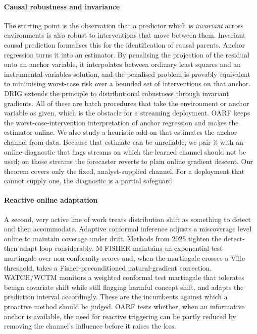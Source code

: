 \documentclass[authoryear,preprint,12pt]{elsarticle}
\theoremstyle{plain}
\theoremstyle{remark}
\newcommand{\OARF}{\textsc{OARF}}
\begin{document}
\paragraph{Causal robustness and invariance} The starting point is the observation
that a predictor which is \emph{invariant} across environments is also robust to
interventions that move between them. Invariant causal prediction
\citep{peters2016invariant} formalises this for the identification of causal
parents. Anchor regression \citep{rothenhausler2021anchor} turns it into an
estimator. By penalising the projection of the residual onto an anchor variable, it
interpolates between ordinary least squares and an instrumental-variables solution,
and the penalised problem is provably equivalent to minimising worst-case risk over
a bounded set of interventions on that anchor. DRIG \citep{shen2023drig} extends
the principle to distributional robustness through invariant gradients. All of
these are batch procedures that take the environment or anchor variable as given,
which is the obstacle for a streaming deployment. \OARF{} keeps the
worst-case-intervention interpretation of anchor regression and makes the estimator
online. We also study a heuristic add-on that estimates the anchor channel from
data. Because that estimate can be unreliable, we pair it with an online diagnostic
that flags streams on which the learned channel should not be used; on those streams
the forecaster reverts to plain online gradient descent. Our theorem covers only the
fixed, analyst-supplied channel. For a deployment that cannot supply one, the
diagnostic is a partial safeguard.

\paragraph{Reactive online adaptation} A second, very active line of work treats
distribution shift as something to detect and then accommodate. Adaptive conformal
inference \citep{gibbs2021aci} adjusts a miscoverage level online to maintain
coverage under drift. Methods from 2025 tighten the detect-then-adapt loop
considerably. M-FISHER \citep{mfisher2025} maintains an exponential test martingale
over non-conformity scores and, when the martingale crosses a Ville threshold,
takes a Fisher-preconditioned natural-gradient correction. WATCH/WCTM
\citep{watch2025} monitors a weighted conformal test martingale that tolerates
benign covariate shift while still flagging harmful concept shift, and adapts the
prediction interval accordingly. These are the incumbents against which a proactive
method should be judged. \OARF{} tests whether, when an informative anchor is
available, the need for reactive triggering can be partly reduced by removing the
channel's influence before it raises the loss.
\end{document}
